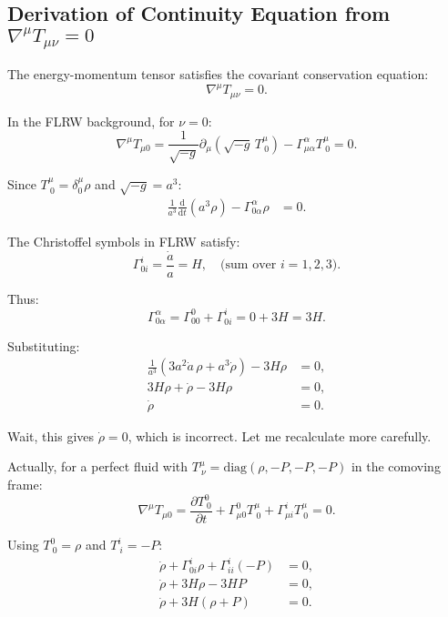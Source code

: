\documentclass[11pt,a4paper]{article}
\numberwithin{equation}{section}
\theoremstyle{plain}
\theoremstyle{definition}
\theoremstyle{remark}
\newcommand{\dd}{\mathrm{d}}
\begin{document}
\subsection{Derivation of Continuity Equation from $\nabla^\mu T_{\mu\nu} = 0$}

The energy-momentum tensor satisfies the covariant conservation equation:
\begin{equation}
\nabla^\mu T_{\mu\nu} = 0.
\label{eq:covariant-conservation}
\end{equation}

In the FLRW background, for $\nu = 0$:
\begin{equation}
\nabla^\mu T_{\mu 0} = \frac{1}{\sqrt{-g}}\partial_\mu\left(\sqrt{-g}\,T^\mu_{\ 0}\right) - \Gamma^\alpha_{\mu\alpha}T^\mu_{\ 0} = 0.
\end{equation}

Since $T^\mu_{\ 0} = \delta^\mu_0\rho$ and $\sqrt{-g} = a^3$:
\begin{align}
\frac{1}{a^3}\frac{\dd}{\dd t}\left(a^3\rho\right) - \Gamma^\alpha_{0\alpha}\rho &= 0.
\end{align}

The Christoffel symbols in FLRW satisfy:
\begin{equation}
\Gamma^i_{0i} = \frac{\dot{a}}{a} = H,\quad\text{(sum over } i=1,2,3\text{)}.
\end{equation}

Thus:
\begin{equation}
\Gamma^\alpha_{0\alpha} = \Gamma^0_{00} + \Gamma^i_{0i} = 0 + 3H = 3H.
\end{equation}

Substituting:
\begin{align}
\frac{1}{a^3}\left(3a^2\dot{a}\,\rho + a^3\dot{\rho}\right) - 3H\rho &= 0,\\
3H\rho + \dot{\rho} - 3H\rho &= 0,\\
\dot{\rho} &= 0.
\end{align}

Wait, this gives $\dot{\rho} = 0$, which is incorrect. Let me recalculate more carefully.

Actually, for a perfect fluid with $T^\mu_{\ \nu} = \mathrm{diag}(\rho, -P, -P, -P)$ in the comoving frame:
\begin{equation}
\nabla^\mu T_{\mu 0} = \frac{\partial T^0_{\ 0}}{\partial t} + \Gamma^0_{\mu 0}T^\mu_{\ 0} + \Gamma^i_{\mu i}T^\mu_{\ 0} = 0.
\end{equation}

Using $T^0_{\ 0} = \rho$ and $T^i_{\ i} = -P$:
\begin{align}
\dot{\rho} + \Gamma^i_{0i}\rho + \Gamma^i_{ii}(-P) &= 0,\\
\dot{\rho} + 3H\rho - 3H P &= 0,\\
\dot{\rho} + 3H(\rho + P) &= 0.
\end{align}
\end{document}
